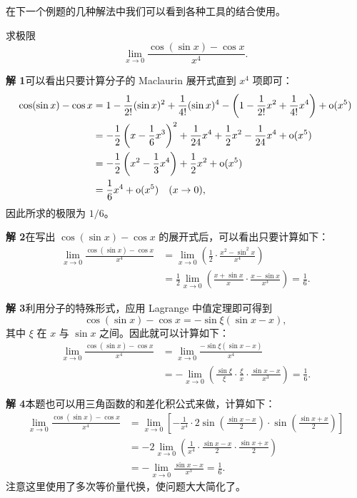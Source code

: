 在下一个例题的几种解法中我们可以看到各种工具的结合使用。

\begin{xexample}[8.1.8]
求极限
\[
  \lim_{x\to0}\frac{\cos(\sin x)-\cos x}{x^4}.
\]
\end{xexample}
\begin{xsolution}
\textbf{解 1}\quad 可以看出只要计算分子的 Maclaurin 展开式直到 $x^4$ 项即可：
\begin{align*}
  \cos(\sin x)-\cos x
  &=1-\frac1{2!}(\sin x)^2+\frac1{4!}(\sin x)^4
    -\left(1-\frac1{2!}x^2+\frac1{4!}x^4\right)+\mathrm{o}(x^5)\\
  &=-\frac12\left(x-\frac16x^3\right)^2+\frac1{24}x^4+\frac12x^2-\frac1{24}x^4+\mathrm{o}(x^5)\\
  &=-\frac12\left(x^2-\frac13x^4\right)+\frac12x^2+\mathrm{o}(x^5)\\
  &=\frac16x^4+\mathrm{o}(x^5)\quad(x\to0),
\end{align*}
因此所求的极限为 $1/6$。

\textbf{解 2}\quad 在写出 $\cos(\sin x)-\cos x$ 的展开式后，可以看出只要计算如下：
\begin{align*}
  \lim_{x\to0}\frac{\cos(\sin x)-\cos x}{x^4}
  &=\lim_{x\to0}\left(\frac12\cdot\frac{x^2-\sin^2x}{x^4}\right)\\
  &=\frac12\lim_{x\to0}\left(\frac{x+\sin x}{x}\cdot\frac{x-\sin x}{x^3}\right)
  =\frac16.
\end{align*}

\textbf{解 3}\quad 利用分子的特殊形式，应用 Lagrange 中值定理即可得到
\[
  \cos(\sin x)-\cos x=-\sin\xi(\sin x-x),
\]
其中 $\xi$ 在 $x$ 与 $\sin x$ 之间。因此就可以计算如下：
\begin{align*}
  \lim_{x\to0}\frac{\cos(\sin x)-\cos x}{x^4}
  &=\lim_{x\to0}\frac{-\sin\xi(\sin x-x)}{x^4}\\
  &=-\lim_{x\to0}\left(\frac{\sin\xi}{\xi}\cdot\frac{\xi}{x}\cdot\frac{\sin x-x}{x^3}\right)
  =\frac16.
\end{align*}

\textbf{解 4}\quad 本题也可以用三角函数的和差化积公式来做，计算如下：
\begin{align*}
  \lim_{x\to0}\frac{\cos(\sin x)-\cos x}{x^4}
  &=\lim_{x\to0}\left[-\frac1{x^4}\cdot2\sin\left(\frac{\sin x-x}{2}\right)
  \cdot\sin\left(\frac{\sin x+x}{2}\right)\right]\\
  &=-2\lim_{x\to0}\left(\frac1{x^4}\cdot\frac{\sin x-x}{2}\cdot\frac{\sin x+x}{2}\right)\\
  &=-\lim_{x\to0}\frac{\sin x-x}{x^3}=\frac16.
\end{align*}
注意这里使用了多次等价量代换，使问题大大简化了。
\end{xsolution}

